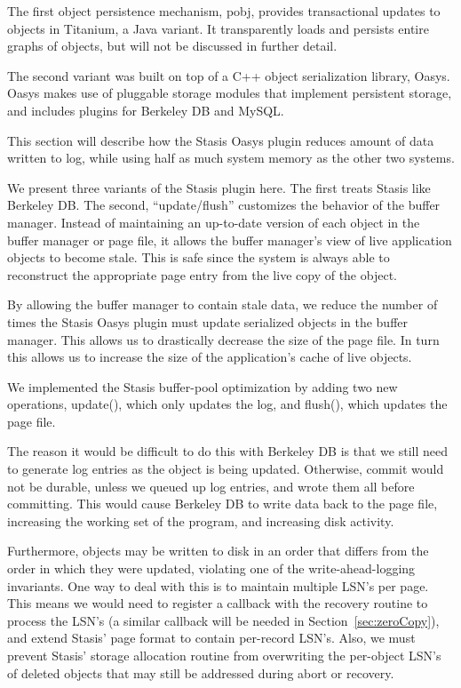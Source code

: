 \documentclass[letterpaper,twocolumn,10pt]{article}
\newcommand{\yad}{Stasis\xspace}
\newcommand{\yads}{Stasis'\xspace}
\newcommand{\oasys}{Oasys\xspace}
\begin{document}
The first object persistence mechanism, pobj, provides transactional updates to objects in
Titanium, a Java variant.  It transparently loads and persists
entire graphs of objects, but will not be discussed in further detail.

The second variant was built on top of a C++ object
serialization library, \oasys.  \oasys makes use of pluggable storage
modules that implement persistent storage, and includes plugins
for Berkeley DB and MySQL.  

This section will describe how the \yad
\oasys plugin reduces amount of data written to log, while using half as much system
memory as the other two systems.

We present three variants of the \yad plugin here.  The first treats \yad like
Berkeley DB.  The second, ``update/flush'' customizes the behavior of the buffer
manager.  Instead of maintaining an up-to-date version of each object
in the buffer manager or page file, it allows the buffer manager's
view of live application objects to become stale.  This is safe since
the system is always able to reconstruct the appropriate page entry
from the live copy of the object.

By allowing the buffer manager to contain stale data, we reduce the
number of times the \yad \oasys plugin must update serialized objects in the buffer manager.
This allows us to drastically decrease the
size of the page file.  In turn this allows us to increase the size of
the application's cache of live objects.

We implemented the \yad buffer-pool optimization by adding two new
operations, update(), which only updates the log, and flush(), which
updates the page file.  

The reason it would be difficult to do this with Berkeley DB is that
we still need to generate log entries as the object is being updated.
Otherwise, commit would not be durable, unless we queued up log 
entries, and wrote them all before committing.  
  This would cause Berkeley DB to write data back to the
page file, increasing the working set of the program, and increasing
disk activity.

Furthermore, objects may be written to disk in an
order that differs from the order in which they were updated, 
violating one of the write-ahead-logging invariants.  One way to 
deal with this is to maintain multiple LSN's per page.  This means we would need to register a
callback with the recovery routine to process the LSN's (a similar
callback will be needed in Section~\ref{sec:zeroCopy}), and 
extend \yads page format to contain per-record LSN's.  
Also, we must prevent \yads storage allocation routine from overwriting the per-object 
LSN's of deleted objects that may still be addressed during abort or recovery.  
\end{document}
